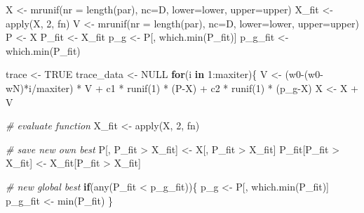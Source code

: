 \documentclass[
  oneside]{book}
\newenvironment{Shaded}{\begin{snugshade}}{\end{snugshade}}
\newcommand{\AttributeTok}[1]{\textcolor[rgb]{0.77,0.63,0.00}{#1}}
\newcommand{\CommentTok}[1]{\textcolor[rgb]{0.56,0.35,0.01}{\textit{#1}}}
\newcommand{\ConstantTok}[1]{\textcolor[rgb]{0.00,0.00,0.00}{#1}}
\newcommand{\ControlFlowTok}[1]{\textcolor[rgb]{0.13,0.29,0.53}{\textbf{#1}}}
\newcommand{\DecValTok}[1]{\textcolor[rgb]{0.00,0.00,0.81}{#1}}
\newcommand{\FunctionTok}[1]{\textcolor[rgb]{0.00,0.00,0.00}{#1}}
\newcommand{\NormalTok}[1]{#1}
\newcommand{\OtherTok}[1]{\textcolor[rgb]{0.56,0.35,0.01}{#1}}
\newcommand{\SpecialCharTok}[1]{\textcolor[rgb]{0.00,0.00,0.00}{#1}}
\begin{document}
\begin{Shaded}
\begin{Highlighting}[]
\NormalTok{X }\OtherTok{\textless{}{-}} \FunctionTok{mrunif}\NormalTok{(}\AttributeTok{nr =} \FunctionTok{length}\NormalTok{(par), }\AttributeTok{nc=}\NormalTok{D, }\AttributeTok{lower=}\NormalTok{lower, }\AttributeTok{upper=}\NormalTok{upper)}
\NormalTok{X\_fit }\OtherTok{\textless{}{-}} \FunctionTok{apply}\NormalTok{(X, }\DecValTok{2}\NormalTok{, fn)}
\NormalTok{V }\OtherTok{\textless{}{-}} \FunctionTok{mrunif}\NormalTok{(}\AttributeTok{nr =} \FunctionTok{length}\NormalTok{(par), }\AttributeTok{nc=}\NormalTok{D, }\AttributeTok{lower=}\NormalTok{lower, }\AttributeTok{upper=}\NormalTok{upper)}
\NormalTok{P }\OtherTok{\textless{}{-}}\NormalTok{ X}
\NormalTok{P\_fit }\OtherTok{\textless{}{-}}\NormalTok{ X\_fit}
\NormalTok{p\_g }\OtherTok{\textless{}{-}}\NormalTok{ P[, }\FunctionTok{which.min}\NormalTok{(P\_fit)]}
\NormalTok{p\_g\_fit }\OtherTok{\textless{}{-}} \FunctionTok{which.min}\NormalTok{(P\_fit)}

\NormalTok{trace }\OtherTok{\textless{}{-}} \ConstantTok{TRUE}
\NormalTok{trace\_data }\OtherTok{\textless{}{-}} \ConstantTok{NULL}
\ControlFlowTok{for}\NormalTok{(i }\ControlFlowTok{in} \DecValTok{1}\SpecialCharTok{:}\NormalTok{maxiter)\{}
\NormalTok{  V }\OtherTok{\textless{}{-}}\NormalTok{ (w0}\SpecialCharTok{{-}}\NormalTok{(w0}\SpecialCharTok{{-}}\NormalTok{wN)}\SpecialCharTok{*}\NormalTok{i}\SpecialCharTok{/}\NormalTok{maxiter) }\SpecialCharTok{*}\NormalTok{ V }\SpecialCharTok{+}\NormalTok{ c1 }\SpecialCharTok{*} \FunctionTok{runif}\NormalTok{(}\DecValTok{1}\NormalTok{) }\SpecialCharTok{*}\NormalTok{ (P}\SpecialCharTok{{-}}\NormalTok{X) }\SpecialCharTok{+}\NormalTok{ c2 }\SpecialCharTok{*} \FunctionTok{runif}\NormalTok{(}\DecValTok{1}\NormalTok{) }\SpecialCharTok{*}\NormalTok{ (p\_g}\SpecialCharTok{{-}}\NormalTok{X)}
\NormalTok{  X }\OtherTok{\textless{}{-}}\NormalTok{ X }\SpecialCharTok{+}\NormalTok{ V}
  
  \CommentTok{\# evaluate function}
\NormalTok{  X\_fit }\OtherTok{\textless{}{-}} \FunctionTok{apply}\NormalTok{(X, }\DecValTok{2}\NormalTok{, fn)}
  
  \CommentTok{\# save new own best}
\NormalTok{  P[, P\_fit }\SpecialCharTok{\textgreater{}}\NormalTok{ X\_fit] }\OtherTok{\textless{}{-}}\NormalTok{ X[, P\_fit }\SpecialCharTok{\textgreater{}}\NormalTok{ X\_fit]}
\NormalTok{  P\_fit[P\_fit }\SpecialCharTok{\textgreater{}}\NormalTok{ X\_fit] }\OtherTok{\textless{}{-}}\NormalTok{ X\_fit[P\_fit }\SpecialCharTok{\textgreater{}}\NormalTok{ X\_fit]}
  
  \CommentTok{\# new global best}
  \ControlFlowTok{if}\NormalTok{(}\FunctionTok{any}\NormalTok{(P\_fit }\SpecialCharTok{\textless{}}\NormalTok{ p\_g\_fit))\{}
\NormalTok{    p\_g }\OtherTok{\textless{}{-}}\NormalTok{ P[, }\FunctionTok{which.min}\NormalTok{(P\_fit)]}
\NormalTok{    p\_g\_fit }\OtherTok{\textless{}{-}} \FunctionTok{min}\NormalTok{(P\_fit)}
\NormalTok{  \}}
  

\end{Highlighting}
\end{Shaded}
\end{document}
